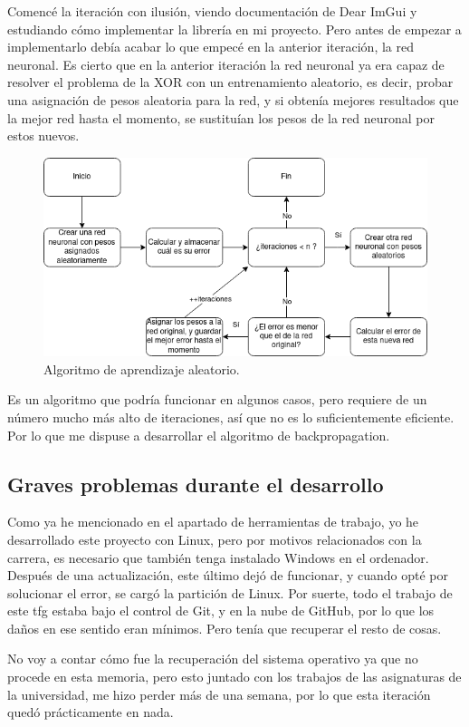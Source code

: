 Comencé la iteración con ilusión, viendo documentación de Dear ImGui y estudiando cómo implementar la librería en mi proyecto. Pero antes de empezar a implementarlo debía acabar lo que empecé en la anterior iteración, la red neuronal. Es cierto que en la anterior iteración la red neuronal ya era capaz de resolver el problema de la XOR con un entrenamiento aleatorio, es decir, probar una asignación de pesos aleatoria para la red, y si obtenía mejores resultados que la mejor red hasta el momento, se sustituían los pesos de la red neuronal por estos nuevos.
\begin{figure}[h]
	\centering
	\includegraphics[width=15cm]{archivos/imagenes/Algoritmo-red-neuronal-aleatorio.png}
	\caption{Algoritmo de aprendizaje aleatorio.}
\end{figure}
Es un algoritmo que podría funcionar en algunos casos, pero requiere de un número mucho más alto de iteraciones, así que no es lo suficientemente eficiente. Por lo que me dispuse a desarrollar el algoritmo de backpropagation.

\subsection{Graves problemas durante el desarrollo}
Como ya he mencionado en el apartado de herramientas de trabajo, yo he desarrollado este proyecto con Linux, pero por motivos relacionados con la carrera, es necesario que también tenga instalado Windows en el ordenador. Después de una actualización, este último dejó de funcionar, y cuando opté por solucionar el error, se cargó la partición de Linux. Por suerte, todo el trabajo de este \gls{tfg} estaba bajo el control de Git, y en la nube de GitHub, por lo que los daños en ese sentido eran mínimos. Pero tenía que recuperar el resto de cosas.

No voy a contar cómo fue la recuperación del sistema operativo ya que no procede en esta memoria, pero esto juntado con los trabajos de las asignaturas de la universidad, me hizo perder más de una semana, por lo que esta iteración quedó prácticamente en nada.


